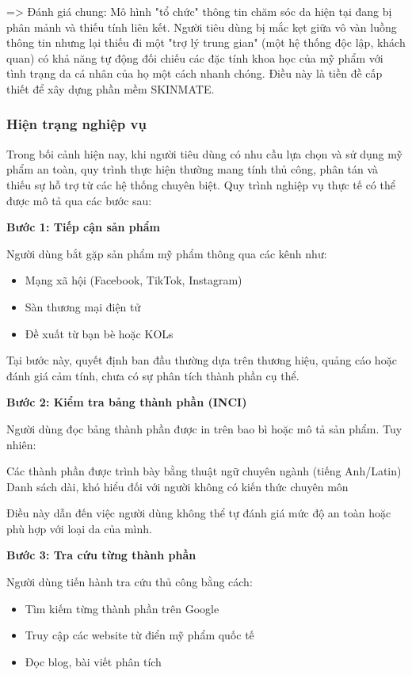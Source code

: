 \documentclass[12pt,a4paper]{article}
\begin{document}
=> Đánh giá chung: Mô hình "tổ chức" thông tin chăm sóc da hiện tại đang bị phân mảnh và thiếu tính liên kết. Người tiêu dùng bị mắc kẹt giữa vô vàn luồng thông tin nhưng lại thiếu đi một "trợ lý trung gian" (một hệ thống độc lập, khách quan) có khả năng tự động đối chiếu các đặc tính khoa học của mỹ phẩm với tình trạng da cá nhân của họ một cách nhanh chóng. Điều này là tiền đề cấp thiết để xây dựng phần mềm SKINMATE.

\subsubsection{Hiện trạng nghiệp vụ}
Trong bối cảnh hiện nay, khi người tiêu dùng có nhu cầu lựa chọn và sử dụng mỹ phẩm an toàn, quy trình thực hiện thường mang tính thủ công, phân tán và thiếu sự hỗ trợ từ các hệ thống chuyên biệt. Quy trình nghiệp vụ thực tế có thể được mô tả qua các bước sau:

\textbf{Bước 1: Tiếp cận sản phẩm}

Người dùng bắt gặp sản phẩm mỹ phẩm thông qua các kênh như:
\begin{itemize}
    \item Mạng xã hội (Facebook, TikTok, Instagram)
    \item Sàn thương mại điện tử
    \item Đề xuất từ bạn bè hoặc KOLs
\end{itemize}

Tại bước này, quyết định ban đầu thường dựa trên thương hiệu, quảng cáo hoặc đánh giá cảm tính, chưa có sự phân tích thành phần cụ thể.

\textbf{Bước 2: Kiểm tra bảng thành phần (INCI)}

Người dùng đọc bảng thành phần được in trên bao bì hoặc mô tả sản phẩm. Tuy nhiên:

Các thành phần được trình bày bằng thuật ngữ chuyên ngành (tiếng Anh/Latin)
Danh sách dài, khó hiểu đối với người không có kiến thức chuyên môn

Điều này dẫn đến việc người dùng không thể tự đánh giá mức độ an toàn hoặc phù hợp với loại da của mình.

\textbf{Bước 3: Tra cứu từng thành phần}

Người dùng tiến hành tra cứu thủ công bằng cách:
\begin{itemize}
    \item Tìm kiếm từng thành phần trên Google
    \item Truy cập các website từ điển mỹ phẩm quốc tế
    \item Đọc blog, bài viết phân tích
\end{itemize}
\end{document}
